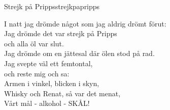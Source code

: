 \begin{song}{Strejk på Pripps}{strejkpapripps}
\begin{vers}
I natt jag drömde något som jag aldrig drömt förut:\\
Jag drömde det var strejk på Pripps\\
och alla öl var slut.\\
Jag drömde om en jättesal där ölen stod på rad.\\
Jag svepte väl ett femtontal,\\
och reste mig och sa:\\
Armen i vinkel, blicken i skyn,\\
Whisky och Renat, så var det menat,\\
Vårt mål - alkohol - SKÅL!\\
\end{vers}
\end{song}
